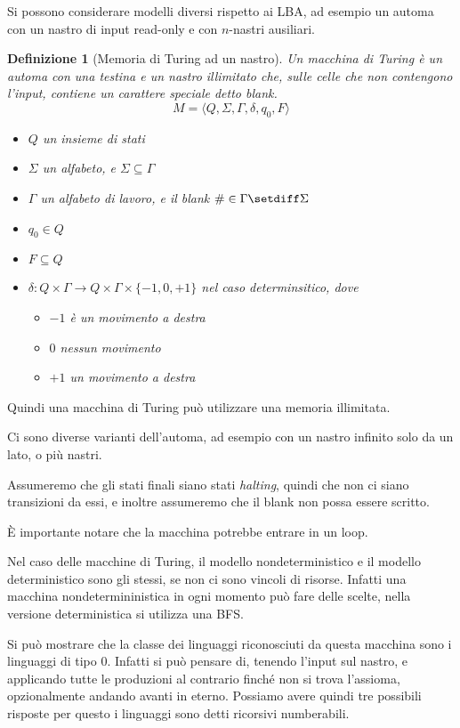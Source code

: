 \documentclass[12pt]{article}
\newtheorem{definizione}{Definizione}
\begin{document}
\tableofcontents
\newpage
Si possono considerare modelli diversi rispetto ai LBA, ad esempio un automa con un nastro di input read-only e con $n$-nastri ausiliari.

\begin{definizione}[Memoria di Turing ad un nastro]
	Un macchina di Turing è un automa con una testina e un nastro illimitato che, sulle celle che non contengono l'input, contiene un carattere speciale detto \textit{blank}.
	$$ M = \langle Q, \Sigma, \Gamma, \delta, q_0, F \rangle $$
	\begin{itemize}
		\item $Q$ un insieme di stati
		\item $\Sigma$ un alfabeto, e $\Sigma \subseteq \Gamma$
		\item $\Gamma$ un alfabeto di lavoro, e il blank $\# \in \Gamma \setdiff \Sigma$
		\item $q_0 \in Q$
		\item $F \subseteq Q$
		\item $\delta : Q \times \Gamma \rightarrow Q \times \Gamma \times \{-1, 0, +1\} $ nel caso determinsitico,
			dove
			\begin{itemize}
				\item $-1$ è un movimento a destra
				\item $0$ nessun movimento
				\item $+1$ un movimento a destra
			\end{itemize}
	\end{itemize}
\end{definizione}
Quindi una macchina di Turing può utilizzare una memoria illimitata.

Ci sono diverse varianti dell'automa, ad esempio con un nastro infinito solo da un lato, o più nastri.

Assumeremo che gli stati finali siano stati \textit{halting}, quindi che non ci siano transizioni da essi, e inoltre assumeremo che il blank non possa essere scritto.

\`E importante notare che la macchina potrebbe entrare in un loop.

Nel caso delle macchine di Turing, il modello nondeterministico e il modello deterministico sono gli stessi, se non ci sono vincoli di risorse.
Infatti una macchina nondetermininistica in ogni momento può fare delle scelte, nella versione deterministica si utilizza una BFS.

Si può mostrare che la classe dei linguaggi riconosciuti da questa macchina sono i linguaggi di tipo 0.
Infatti si può pensare di, tenendo l'input sul nastro, e applicando tutte le produzioni al contrario finché non si trova l'assioma, opzionalmente andando avanti in eterno.
Possiamo avere quindi tre possibili risposte
per questo i linguaggi sono detti ricorsivi numberabili.
\end{document}

